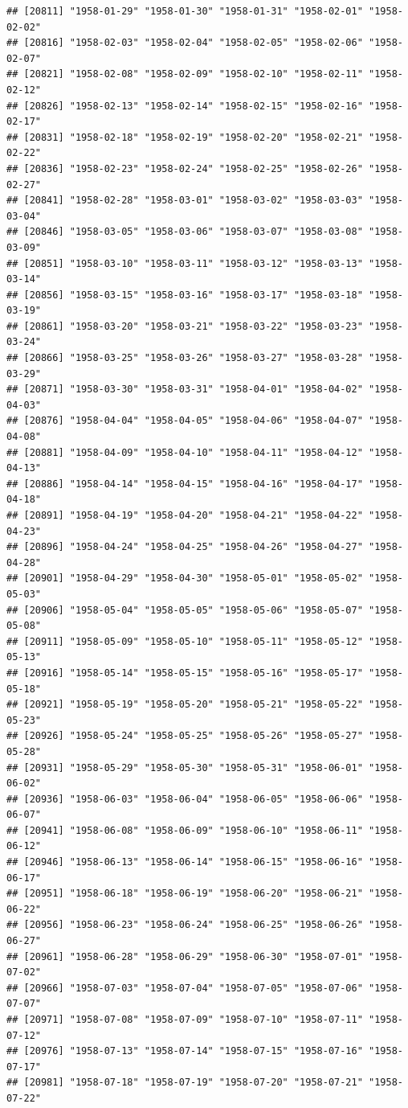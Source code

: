 \documentclass{article}\usepackage[]{graphicx}\usepackage[]{color}
\makeatletter
\newenvironment{kframe}{%
 \def\at@end@of@kframe{}%
 \ifinner\ifhmode%
  \def\at@end@of@kframe{\end{minipage}}%
  \begin{minipage}{\columnwidth}%
 \fi\fi%
 \def\FrameCommand##1{\hskip\@totalleftmargin \hskip-\fboxsep
 \colorbox{shadecolor}{##1}\hskip-\fboxsep
     \hskip-\linewidth \hskip-\@totalleftmargin \hskip\columnwidth}%
 \MakeFramed {\advance\hsize-\width
   \@totalleftmargin\z@ \linewidth\hsize
   \@setminipage}}%
 {\par\unskip\endMakeFramed%
 \at@end@of@kframe}
\newenvironment{knitrout}{}{} %
\makeatother
\begin{document}
\begin{description}
\begin{knitrout}
\begin{kframe}
\begin{verbatim}
## [20811] "1958-01-29" "1958-01-30" "1958-01-31" "1958-02-01" "1958-02-02"
## [20816] "1958-02-03" "1958-02-04" "1958-02-05" "1958-02-06" "1958-02-07"
## [20821] "1958-02-08" "1958-02-09" "1958-02-10" "1958-02-11" "1958-02-12"
## [20826] "1958-02-13" "1958-02-14" "1958-02-15" "1958-02-16" "1958-02-17"
## [20831] "1958-02-18" "1958-02-19" "1958-02-20" "1958-02-21" "1958-02-22"
## [20836] "1958-02-23" "1958-02-24" "1958-02-25" "1958-02-26" "1958-02-27"
## [20841] "1958-02-28" "1958-03-01" "1958-03-02" "1958-03-03" "1958-03-04"
## [20846] "1958-03-05" "1958-03-06" "1958-03-07" "1958-03-08" "1958-03-09"
## [20851] "1958-03-10" "1958-03-11" "1958-03-12" "1958-03-13" "1958-03-14"
## [20856] "1958-03-15" "1958-03-16" "1958-03-17" "1958-03-18" "1958-03-19"
## [20861] "1958-03-20" "1958-03-21" "1958-03-22" "1958-03-23" "1958-03-24"
## [20866] "1958-03-25" "1958-03-26" "1958-03-27" "1958-03-28" "1958-03-29"
## [20871] "1958-03-30" "1958-03-31" "1958-04-01" "1958-04-02" "1958-04-03"
## [20876] "1958-04-04" "1958-04-05" "1958-04-06" "1958-04-07" "1958-04-08"
## [20881] "1958-04-09" "1958-04-10" "1958-04-11" "1958-04-12" "1958-04-13"
## [20886] "1958-04-14" "1958-04-15" "1958-04-16" "1958-04-17" "1958-04-18"
## [20891] "1958-04-19" "1958-04-20" "1958-04-21" "1958-04-22" "1958-04-23"
## [20896] "1958-04-24" "1958-04-25" "1958-04-26" "1958-04-27" "1958-04-28"
## [20901] "1958-04-29" "1958-04-30" "1958-05-01" "1958-05-02" "1958-05-03"
## [20906] "1958-05-04" "1958-05-05" "1958-05-06" "1958-05-07" "1958-05-08"
## [20911] "1958-05-09" "1958-05-10" "1958-05-11" "1958-05-12" "1958-05-13"
## [20916] "1958-05-14" "1958-05-15" "1958-05-16" "1958-05-17" "1958-05-18"
## [20921] "1958-05-19" "1958-05-20" "1958-05-21" "1958-05-22" "1958-05-23"
## [20926] "1958-05-24" "1958-05-25" "1958-05-26" "1958-05-27" "1958-05-28"
## [20931] "1958-05-29" "1958-05-30" "1958-05-31" "1958-06-01" "1958-06-02"
## [20936] "1958-06-03" "1958-06-04" "1958-06-05" "1958-06-06" "1958-06-07"
## [20941] "1958-06-08" "1958-06-09" "1958-06-10" "1958-06-11" "1958-06-12"
## [20946] "1958-06-13" "1958-06-14" "1958-06-15" "1958-06-16" "1958-06-17"
## [20951] "1958-06-18" "1958-06-19" "1958-06-20" "1958-06-21" "1958-06-22"
## [20956] "1958-06-23" "1958-06-24" "1958-06-25" "1958-06-26" "1958-06-27"
## [20961] "1958-06-28" "1958-06-29" "1958-06-30" "1958-07-01" "1958-07-02"
## [20966] "1958-07-03" "1958-07-04" "1958-07-05" "1958-07-06" "1958-07-07"
## [20971] "1958-07-08" "1958-07-09" "1958-07-10" "1958-07-11" "1958-07-12"
## [20976] "1958-07-13" "1958-07-14" "1958-07-15" "1958-07-16" "1958-07-17"
## [20981] "1958-07-18" "1958-07-19" "1958-07-20" "1958-07-21" "1958-07-22"

\end{verbatim}
\end{kframe}
\end{knitrout}
\end{description}
\end{document}
